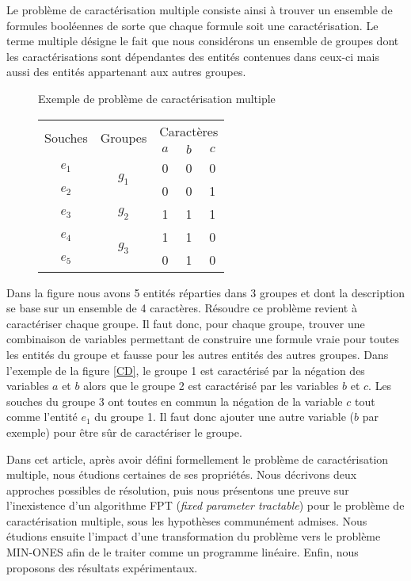 \documentclass[a4paper,10pt]{article}
\begin{document}
Le problème de caractérisation multiple consiste ainsi à trouver un ensemble de
formules booléennes de sorte que chaque formule soit une caractérisation. Le terme
multiple désigne le fait que nous considérons un ensemble de groupes dont les
caractérisations sont dépendantes des entités contenues dans ceux-ci mais aussi
des entités appartenant aux autres groupes.

\begin{figure}[H]{Exemple de problème de caractérisation multiple}
\begin{center}
\begin{tabular}{|c||c|c|c|c|}
\hline
\multirow{2}{*}{Souches}&\multirow{2}{*}{Groupes}&\multicolumn{3}{c|}{Caractères
}\\
&&$a$&$b$&$c$\\
\hline
\hline
$e_1$&\multirow{2}{*}{$g_1$}&\cellcolor{lightgray}0&\cellcolor{lightgray}0&0\\
\cline{1-1} \cline{3-5}
$e_2$&&\cellcolor{lightgray}0& \cellcolor{lightgray}0&1\\
\hline
\hline
$e_3$&$g_2$&1&\cellcolor{lightgray}1&\cellcolor{lightgray}1\\
\hline
\hline
$e_4$&\multirow{2}{*}{$g_3$}&1&\cellcolor{lightgray}1&\cellcolor{lightgray}0\\
\cline{1-1} \cline{3-5}
$e_5$&&0&\cellcolor{lightgray}1&\cellcolor{lightgray}0\\
\hline
\end{tabular}
\end{center}
\end{figure}

Dans la figure  nous avons 5 entités réparties dans 3 groupes et dont
la description se base sur un ensemble de 4 caractères.
Résoudre ce problème revient à caractériser chaque groupe. Il faut donc, pour
chaque groupe, trouver une combinaison de  variables permettant de construire une formule vraie pour toutes les
entités du groupe et fausse pour les autres entités des autres
groupes. Dans l'exemple de la figure \ref{CD}, le groupe 1 est caractérisé par
la négation des variables $a$ et $b$  alors que le groupe 2 est caractérisé par
les variables $b$ et $c$. Les souches du groupe 3 ont toutes en commun la
négation de la variable $c$ tout comme l'entité $e_1$ du groupe 1. Il faut donc
ajouter une autre variable ($b$ par exemple) pour être sûr de caractériser le
groupe.

Dans cet article, après avoir défini formellement le problème de caractérisation
multiple, nous étudions certaines de ses propriétés. Nous décrivons deux approches possibles de résolution, puis nous présentons une preuve sur l'inexistence d'un algorithme FPT ({\em fixed parameter tractable}) pour le problème de caractérisation multiple, sous les hypothèses communément admises. Nous étudions ensuite l'impact d'une transformation du problème vers le problème MIN-ONES afin de le traiter comme un programme linéaire. Enfin, nous proposons des résultats expérimentaux.
\end{document}
